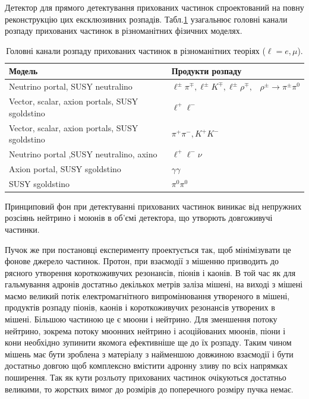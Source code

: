 	Детектор для прямого детектування прихованих частинок спроектований на повну реконструкцію цих ексклюзивних розпадів. Табл.\ref{table:req_decaymodes} узагальнює головні канали розпаду прихованих частинок в різноманітних фізичних моделях.
	
	
	\begin{table}[htb]
\begin{center}
\caption{ Головні канали розпаду прихованих частинок в різноманітних теоріях ($\ell = e, \mu$).}
\label{table:req_decaymodes}
\vspace{2mm}
\begin{tabular}{ll}
\hline
Модель	& Продукти розпаду \\
\hline
Neutrino portal, SUSY neutralino                 & $\ell^{\pm}\pi^{\mp}, \ell^{\pm} K^{\mp}, \ell^{\pm}\rho^{\mp},\,\,\,\,\, \rho^{\pm}\rightarrow \pi^{\pm}\pi^0$ \\
Vector, scalar, axion portals, SUSY sgoldstino   & $\ell^+\ell^-$ \\
Vector, scalar, axion portals, SUSY sgoldstino   & $\pi^+\pi^-, K^+K^-$ \\
Neutrino portal ,SUSY neutralino, axino          & $\ell^+\ell^-\nu$ \\
Axion portal, SUSY sgoldstino                    & $\gamma\gamma$ \\
SUSY sgoldstino                                  & $\pi^0\pi^0$ \\
\hline
\end{tabular}
\end{center}
\end{table}

	Принциповий фон при детектуванні прихованих частинок виникає від непружних розсіянь нейтрино і моюнів в об’ємі детектора, що  утворють довгоживучі частинки.
	
	Пучок же при постановці експерименту проектується так, щоб мінімізувати це фонове джерело частинок. Протон, при взаємодії з мішенню призводить до рясного утворення короткоживучих резонансів, піонів і каонів. В той час як для гальмування адронів достатньо декількох метрів заліза мішені, на виході з мішені маємо великий потік електромагнітного випромінювання утвореного в мішені, продуктів розпаду піонів, каонів і короткоживучих  резонансів утворених в мішені. Більшою частиною це є мюони і нейтрино. Для зменшення потоку нейтрино, зокрема потоку мюонних нейтрино і асоційованих мюонів, піони і кони необхідно зупинити якомога ефективніше ще до їх розпаду. Таким чином мішень має бути зроблена з матеріалу з найменшою довжиною взаємодії і бути достатньо довгою щоб комплексно вмістити адронну зливу по всіх напрямках поширення. Так як кути розльоту прихованих частинок очікуються достатньо великими, то жорстких вимог до розмірів до поперечного розміру пучка немає.
	

